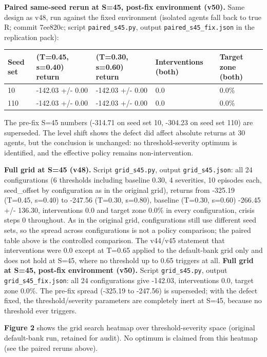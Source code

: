 \documentclass[11pt]{article}
\begin{document}
\textbf{Paired same-seed rerun at S=45, post-fix environment (v50).} Same design as v48, run against the fixed environment (isolated agents fall back to true R; commit 7ee820c; script \texttt{paired\_s45.py}, output \texttt{paired\_s45\_fix.json} in the replication pack):

\begin{table}[htbp]
\centering
\begin{tabular}{lllll}
\toprule
\textbf{Seed set} & \textbf{(T=0.45, s=0.40) return} & \textbf{(T=0.30, s=0.60) return} & \textbf{Interventions (both)} & \textbf{Target zone (both)} \\
\midrule
10 & -142.03 +/- 0.00 & -142.03 +/- 0.00 & 0.0 & 0.0\% \\
110 & -142.03 +/- 0.00 & -142.03 +/- 0.00 & 0.0 & 0.0\% \\
\bottomrule
\end{tabular}
\end{table}

The pre-fix S=45 numbers (-314.71 on seed set 10, -304.23 on seed set 110) are superseded. The level shift shows the defect did affect absolute returns at 30 agents, but the conclusion is unchanged: no threshold-severity optimum is identified, and the effective policy remains non-intervention.

\textbf{Full grid at S=45 (v48).} Script \texttt{grid\_s45.py}, output \texttt{grid\_s45.json}: all 24 configurations (6 thresholds including baseline 0.30, 4 severities, 10 episodes each, seed\_offset by configuration as in the original grid), returns from -325.19 (T=0.45, s=0.40) to -247.56 (T=0.30, s=0.80), baseline (T=0.30, s=0.60) -266.45 +/- 136.30, interventions 0.0 and target zone 0.0\% in every configuration, crisis steps 0 throughout. As in the original grid, configurations still use different seed sets, so the spread across configurations is not a policy comparison; the paired table above is the controlled comparison. The v44/v45 statement that interventions were 0.0 except at T=0.65 applied to the default-bank grid only and does not hold at S=45, where no threshold up to 0.65 triggers at all. \textbf{Full grid at S=45, post-fix environment (v50).} Script \texttt{grid\_s45.py}, output \texttt{grid\_s45\_fix.json}: all 24 configurations give -142.03, interventions 0.0, target zone 0.0\%. The pre-fix spread (-325.19 to -247.56) is superseded; with the defect fixed, the threshold/severity parameters are completely inert at S=45, because no threshold ever triggers.

\textbf{Figure 2} shows the grid search heatmap over threshold-severity space (original default-bank run, retained for audit). No optimum is claimed from this heatmap (see the paired reruns above).
\end{document}
